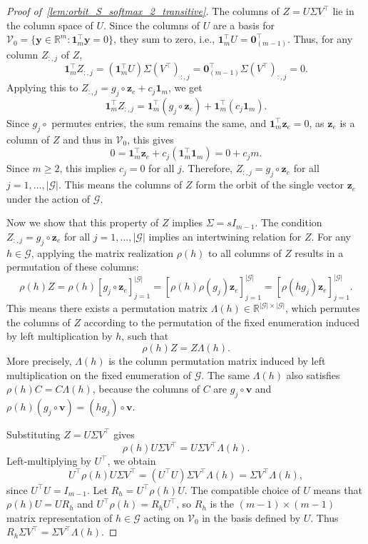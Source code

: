 \documentclass[11pt]{article}
\begin{document}
\begin{proof}[Proof of~\cref{lem:orbit_S_softmax_2_transitive}]
The columns of \(Z = U\Sigma V^{\top}\) lie in the column space of \(U\). Since the columns of \(U\) are a basis for \(\mathcal V_0 = \{\boldsymbol{y} \in \mathbb{R}^m : \boldsymbol{1}_m^\top\boldsymbol{y} = 0\}\), they sum to zero, i.e., \(\boldsymbol{1}_m^\top U = \boldsymbol{0}_{(m-1)}^\top\). Thus, for any column \(Z_{:,j}\) of \(Z\),
\[
\boldsymbol{1}_m^\top Z_{:,j}
= (\boldsymbol{1}_m^\top U)\Sigma (V^{\top})_{:,j}
= \boldsymbol{0}_{(m-1)}^\top \Sigma (V^{\top})_{:,j}
= 0.
\]
Applying this to \(Z_{:,j} = g_j\circ\boldsymbol{z}_{e} + c_j\boldsymbol{1}_m\), we get
\[
\boldsymbol{1}_m^\top Z_{:,j}
= \boldsymbol{1}_m^\top (g_j\circ\boldsymbol{z}_{e}) + \boldsymbol{1}_m^\top (c_j\boldsymbol{1}_m).
\]
Since \(g_j\circ\) permutes entries, the sum remains the same, and \(\boldsymbol{1}_m^\top \boldsymbol{z}_{e} = 0\), as \(\boldsymbol{z}_{e}\) is a column of \(Z\) and thus in \(\mathcal V_0\), this gives
\[
0 = \boldsymbol{1}_m^\top \boldsymbol{z}_{e} + c_j (\boldsymbol{1}_m^\top \boldsymbol{1}_m) = 0 + c_j m.
\]
Since \(m \ge 2\), this implies \(c_j=0\) for all \(j\). Therefore, \(Z_{:,j} = g_j\circ\boldsymbol{z}_{e}\) for all \(j=1,\ldots,|\mathcal G|\). This means the columns of \(Z\) form the orbit of the single vector \(\boldsymbol{z}_{e}\) under the action of \(\mathcal G\).

Now we show that this property of \(Z\) implies \(\Sigma = sI_{m-1}\). The condition \(Z_{:,j} = g_j\circ\boldsymbol{z}_{e}\) for all \(j=1,\ldots,|\mathcal G|\) implies an intertwining relation for \(Z\). For any \(h \in \mathcal G\), applying the matrix realization \(\rho(h)\) to all columns of \(Z\) results in a permutation of these columns:
\[
\rho(h)Z
= \rho(h)[g_j\circ\boldsymbol{z}_{e}]_{j=1}^{|\mathcal G|}
= [\rho(h)\rho(g_j)\boldsymbol{z}_{e}]_{j=1}^{|\mathcal G|}
= [\rho(hg_j)\boldsymbol{z}_{e}]_{j=1}^{|\mathcal G|}.
\]
This means there exists a permutation matrix \(\Lambda(h) \in \mathbb{R}^{|\mathcal G| \times |\mathcal G|}\), which permutes the columns of \(Z\) according to the permutation of the fixed enumeration induced by left multiplication by \(h\), such that
\[
\rho(h)Z = Z\Lambda(h).
\]
More precisely, \(\Lambda(h)\) is the column permutation matrix induced by left multiplication on the fixed enumeration of \(\mathcal G\). The same \(\Lambda(h)\) also satisfies \(\rho(h)C=C\Lambda(h)\), because the columns of \(C\) are \(g_j\circ\boldsymbol{v}\) and \(\rho(h)(g_j\circ\boldsymbol{v})=(hg_j)\circ\boldsymbol{v}\).

Substituting \(Z=U\Sigma V^{\top}\) gives
\[
\rho(h)U\Sigma V^{\top} = U\Sigma V^{\top} \Lambda(h).
\]
Left-multiplying by \(U^{\top}\), we obtain
\[
U^{\top} \rho(h)U\Sigma V^{\top}
= (U^{\top} U)\Sigma V^{\top} \Lambda(h)
= \Sigma V^{\top} \Lambda(h),
\]
since \(U^{\top} U=I_{m-1}\). Let \(R_h = U^{\top} \rho(h)U\). The compatible choice of \(U\) means that \(\rho(h)U=UR_h\) and \(U^{\top}\rho(h)=R_hU^{\top}\), so \(R_h\) is the \((m-1)\times(m-1)\) matrix representation of \(h \in \mathcal G\) acting on \(\mathcal V_0\) in the basis defined by \(U\). Thus \(R_h \Sigma V^{\top} = \Sigma V^{\top} \Lambda(h)\).


\end{proof}
\end{document}
